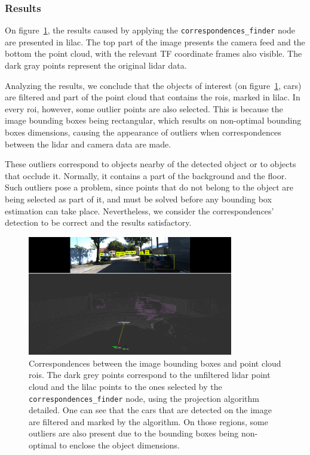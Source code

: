 \subsubsection{Results}
On figure~\ref{fig:projected-correspondences}, the results caused by applying the \texttt{correspondences\_finder} node are presented in lilac. The top part of the image presents the camera feed and the bottom the point cloud, with the relevant TF coordinate frames also visible. The  dark gray points represent the original \ac{lidar} data. 

Analyzing the results, we conclude that the objects of interest (on figure~\ref{fig:projected-correspondences}, cars) are filtered and part of the point cloud that contains the \acp{roi}, marked in lilac. In every \ac{roi}, however, some outlier points are also selected. This is because the image bounding boxes being rectangular, which results on non-optimal bounding boxes dimensions, causing the appearance of outliers when correspondences between the \ac{lidar} and camera data are made.

These outliers correspond to objects nearby of the detected object or to objects that occlude it. Normally, it contains a part of the background and the floor. Such outliers pose a problem, since points that do not belong to the object are being selected as part of it, and must be solved before any bounding box estimation can take place. Nevertheless, we consider the correspondences' detection to be correct and the results satisfactory.


\begin{figure}[!ht]
	\centering
	\includegraphics[width=0.8\textwidth]{img/image-object-to-point-cloud/projected_correspondences.png}
	\caption{Correspondences between the image bounding boxes and point cloud \acp{roi}. The dark grey points correspond to the unfiltered \ac{lidar} point cloud and the lilac points to the ones selected by the \texttt{correspondences\_finder} node, using the projection algorithm detailed. One can see that the cars that are detected on the image are filtered and marked by the algorithm. On those regions, some outliers are also present due to the bounding boxes being non-optimal to enclose the object dimensions.}
	\label{fig:projected-correspondences}
\end{figure}

